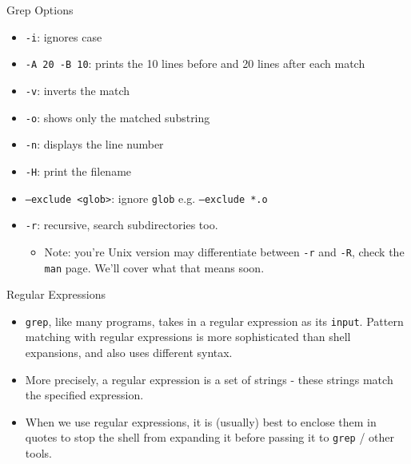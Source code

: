 \documentclass[11pt]{beamer}
\newcommand{\colbf}[1]{\textcolor{mLightBrown!77!black}{#1}}%
\begin{document}
\begin{frame}[fragile]{Grep Options}
  \begin{itemize}
    \item \texttt{-i}: ignores case
    \item \texttt{-A 20 -B 10}: prints the 10 lines before and 20 lines after each match
    \item \texttt{-v}: inverts the match
    \item \texttt{-o}: shows only the matched substring
    \item \texttt{-n}: displays the line number
    \item \texttt{-H}: print the filename
    \item \texttt{--exclude <glob>}: ignore \texttt{glob} e.g. \texttt{--exclude *.o}
    \item \texttt{-r}: recursive, search subdirectories too.
    \begin{itemize}
      \item \colbf{Note}: you're Unix version may differentiate between \texttt{-r} and \texttt{-R}, check the
            \texttt{man} page.  We'll cover what that means soon.
    \end{itemize}
  \end{itemize}
\end{frame}

\begin{frame}[fragile]{Regular Expressions}
  \begin{itemize}[<+- | alert@+>]
    \item \texttt{grep}, like many programs, takes in a \colbf{regular expression} as its \texttt{input}.
          Pattern matching with regular expressions is more sophisticated than shell expansions, and also uses
          different syntax.
    \item More precisely, a regular expression is a set of strings \-- these strings \colbf{match} the specified
          expression.
    \item When we use regular expressions, it is (usually) best to enclose them in quotes to stop the shell from
          expanding it before passing it to \texttt{grep} / other tools.
  \end{itemize}
\end{frame}
\end{document}
